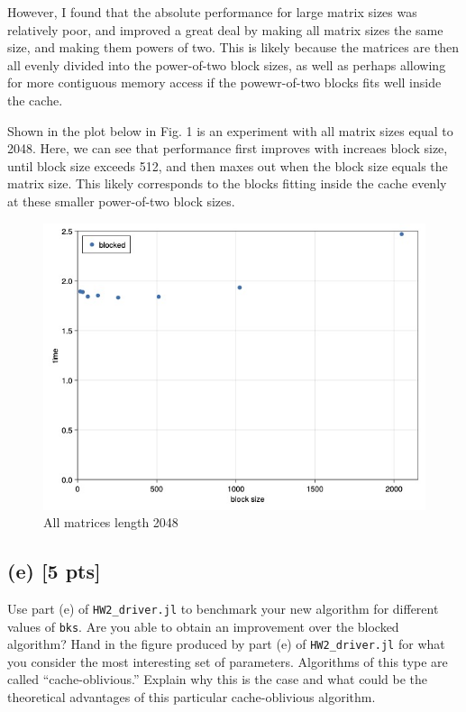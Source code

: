 \documentclass[twoside,10pt]{article}
\begin{document}
However, I found that the absolute performance for large matrix sizes was relatively poor, and improved a great deal by making all matrix sizes the same size, and making them powers of two.
This is likely because the matrices are then all evenly divided into the power-of-two block sizes, as well as perhaps allowing for more contiguous memory access if the powewr-of-two blocks fits well inside the cache.

Shown in the plot below in Fig. 1 is an experiment with all matrix sizes equal to 2048.
Here, we can see that performance first improves with increaes block size, until block size exceeds 512, and then maxes out when the block size equals the matrix size.
This likely corresponds to the blocks fitting inside the cache evenly at these smaller power-of-two block sizes.

\begin{figure}[htb]
  \begin{center}
  \includegraphics[width=150mm]{HW2_code/performance_blocked_2048.jpg}
  \end{center}
  \caption{All matrices length 2048}
  \label{fig:figure1}
  \end{figure}
  

\subsection*{(e) [5 pts]} Use part (e) of \texttt{HW2\_driver.jl} to benchmark your new algorithm for different values of \texttt{bks}. 
Are you able to obtain an improvement over the blocked algorithm? 
Hand in the figure produced by part (e) of \texttt{HW2\_driver.jl} for what you consider the most interesting set of parameters.
Algorithms of this type are called ``cache-oblivious.'' 
Explain why this is the case and what could be the theoretical advantages of this particular cache-oblivious algorithm.
\end{document}
